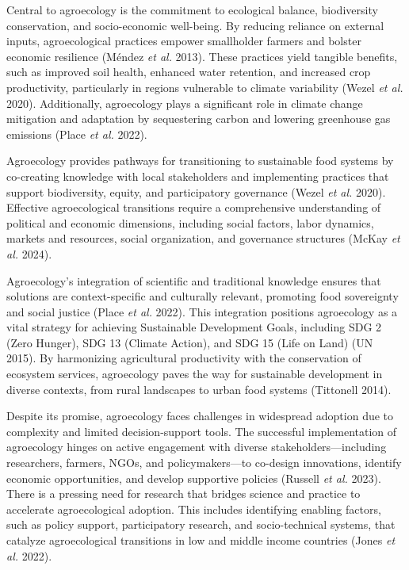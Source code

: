 \documentclass[
]{article}
\begin{document}
Central to agroecology is the commitment to ecological balance,
biodiversity conservation, and socio-economic well-being. By reducing
reliance on external inputs, agroecological practices empower
smallholder farmers and bolster economic resilience (Méndez \emph{et
al.} 2013). These practices yield tangible benefits, such as improved
soil health, enhanced water retention, and increased crop productivity,
particularly in regions vulnerable to climate variability (Wezel
\emph{et al.} 2020). Additionally, agroecology plays a significant role
in climate change mitigation and adaptation by sequestering carbon and
lowering greenhouse gas emissions (Place \emph{et al.} 2022).

Agroecology provides pathways for transitioning to sustainable food
systems by co-creating knowledge with local stakeholders and
implementing practices that support biodiversity, equity, and
participatory governance (Wezel \emph{et al.} 2020). Effective
agroecological transitions require a comprehensive understanding of
political and economic dimensions, including social factors, labor
dynamics, markets and resources, social organization, and governance
structures (McKay \emph{et al.} 2024).

Agroecology's integration of scientific and traditional knowledge
ensures that solutions are context-specific and culturally relevant,
promoting food sovereignty and social justice (Place \emph{et al.}
2022). This integration positions agroecology as a vital strategy for
achieving Sustainable Development Goals, including SDG 2 (Zero Hunger),
SDG 13 (Climate Action), and SDG 15 (Life on Land) (UN 2015). By
harmonizing agricultural productivity with the conservation of ecosystem
services, agroecology paves the way for sustainable development in
diverse contexts, from rural landscapes to urban food systems (Tittonell
2014).

Despite its promise, agroecology faces challenges in widespread adoption
due to complexity and limited decision-support tools. The successful
implementation of agroecology hinges on active engagement with diverse
stakeholders---including researchers, farmers, NGOs, and
policymakers---to co-design innovations, identify economic
opportunities, and develop supportive policies (Russell \emph{et al.}
2023). There is a pressing need for research that bridges science and
practice to accelerate agroecological adoption. This includes
identifying enabling factors, such as policy support, participatory
research, and socio-technical systems, that catalyze agroecological
transitions in low and middle income countries (Jones \emph{et al.}
2022).
\end{document}

